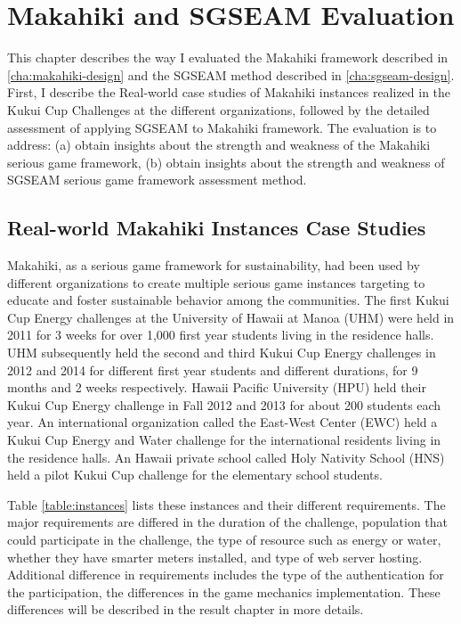 \chapter{Makahiki and SGSEAM Evaluation}
\label{cha:evaluation}

This chapter describes the way I evaluated the Makahiki framework described in \autoref{cha:makahiki-design} and the SGSEAM method described in \autoref{cha:sgseam-design}. First, I describe the Real-world case studies of Makahiki instances realized in the Kukui Cup Challenges at the different organizations, followed by the detailed assessment of applying SGSEAM to Makahiki framework. The evaluation is to address:
(a) obtain insights about the strength and weakness of the Makahiki serious game framework, (b) obtain insights about the strength and weakness of SGSEAM serious game framework assessment method.

\section{Real-world Makahiki Instances Case Studies}

Makahiki, as a serious game framework for sustainability, had been used by different organizations to create multiple serious game instances targeting to educate and foster sustainable behavior among the communities. The first Kukui Cup Energy challenges at the University of Hawaii at Manoa (UHM) were held in 2011 for 3 weeks for over 1,000 first year students living in the residence halls. UHM subsequently held the second and third Kukui Cup Energy challenges in 2012 and 2014 for different first year students and different durations, for 9 months and 2 weeks respectively. Hawaii Pacific University (HPU) held their Kukui Cup Energy challenge in Fall 2012 and 2013 for about 200 students each year. An international organization called the East-West Center (EWC) held a Kukui Cup Energy and Water challenge for the international residents living in the residence halls. An Hawaii private school called Holy Nativity School (HNS) held a pilot Kukui Cup challenge for the elementary school students. 

Table \autoref{table:instances} lists these instances and their different requirements. The major requirements are differed in the duration of the challenge, population that could participate in the challenge, the type of resource such as energy or water, whether they have smarter meters installed, and type of web server hosting. Additional difference in requirements includes the type of the authentication for the participation, the differences in the game mechanics implementation. These differences will be described in the result chapter in more details.

